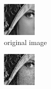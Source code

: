 \documentclass[a4paper, twocolumn, twoside]{article}
\begin{document}
\begin{figure}[h!]
    \centering
    \begin{subfigure}{.24\textwidth}
        \centering
        \includegraphics[width=\linewidth]{images/original_lady.png}
        \caption{original image}
    \end{subfigure}
    \hfill
    \begin{subfigure}{.24\textwidth}
        \centering
        \includegraphics[width=\linewidth]{images/noisy_lady.png}

\end{subfigure}
\end{figure}
\end{document}
